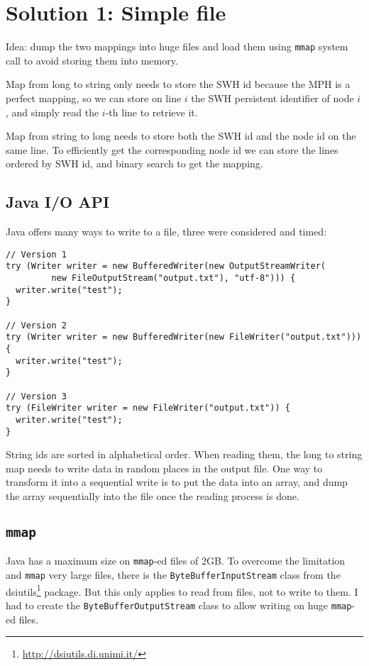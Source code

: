 \documentclass[11pt,a4paper]{article}
\newcommand{\mmap}{\texttt{mmap}}
\begin{document}
\newpage

\section{Solution 1: Simple file}

Idea: dump the two mappings into huge files and load them using \mmap{} system
call to avoid storing them into memory.

Map from long to string only needs to store the SWH id because the MPH is a
perfect mapping, so we can store on line $i$ the SWH persistent identifier of
node $i$, and simply read the $i$-th line to retrieve it.

Map from string to long needs to store both the SWH id and the node id on the
same line. To efficiently get the corresponding node id we can store the lines
ordered by SWH id, and binary search to get the mapping.


\subsection{Java I/O API}

Java offers many ways to write to a file, three were considered and timed:

\begin{small}
\begin{verbatim}
// Version 1
try (Writer writer = new BufferedWriter(new OutputStreamWriter(
         new FileOutputStream("output.txt"), "utf-8"))) {
  writer.write("test");
}

// Version 2
try (Writer writer = new BufferedWriter(new FileWriter("output.txt"))) {
  writer.write("test");
}

// Version 3
try (FileWriter writer = new FileWriter("output.txt")) {
  writer.write("test");
}
\end{verbatim}
\end{small}

String ids are sorted in alphabetical order. When reading them, the long to
string map needs to write data in random places in the output file. One way to
transform it into a sequential write is to put the data into an array, and dump
the array sequentially into the file once the reading process is done.

\subsection{\mmap{}}

Java has a maximum size on \mmap{}-ed files of 2GB. To overcome the limitation
and \mmap{} very large files, there is the
\texttt{ByteBufferInputStream} class from the
dsiutils\footnote{\url{http://dsiutils.di.unimi.it/}} package. But this only
applies to read from files, not to write to them. I had to create the
\texttt{ByteBufferOutputStream} class to allow writing on huge
\mmap{}-ed files.
\end{document}
